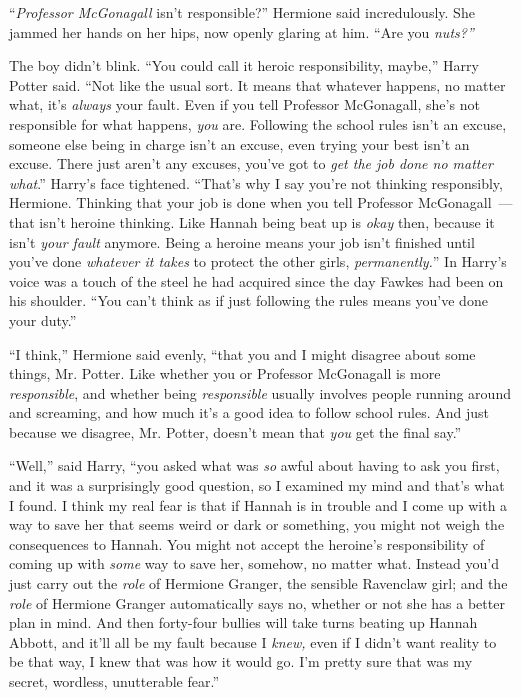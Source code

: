``\emph{Professor McGonagall} isn't responsible?'' Hermione said incredulously. She jammed her hands on her hips, now openly glaring at him. ``Are you \emph{nuts?''}

The boy didn't blink. ``You could call it heroic responsibility, maybe,'' Harry Potter said. ``Not like the usual sort. It means that whatever happens, no matter what, it's \emph{always} your fault. Even if you tell Professor McGonagall, she's not responsible for what happens, \emph{you} are. Following the school rules isn't an excuse, someone else being in charge isn't an excuse, even trying your best isn't an excuse. There just aren't any excuses, you've got to \emph{get the job done no matter what}.'' Harry's face tightened. ``That's why I say you're not thinking responsibly, Hermione. Thinking that your job is done when you tell Professor McGonagall~--- that isn't heroine thinking. Like Hannah being beat up is \emph{okay} then, because it isn't \emph{your fault} anymore. Being a heroine means your job isn't finished until you've done \emph{whatever it takes} to protect the other girls, \emph{permanently.}'' In Harry's voice was a touch of the steel he had acquired since the day Fawkes had been on his shoulder. ``You can't think as if just following the rules means you've done your duty.''

``I think,'' Hermione said evenly, ``that you and I might disagree about some things, Mr. Potter. Like whether you or Professor McGonagall is more \emph{responsible}, and whether being \emph{responsible} usually involves people running around and screaming, and how much it's a good idea to follow school rules. And just because we disagree, Mr. Potter, doesn't mean that \emph{you} get the final say.''

``Well,'' said Harry, ``you asked what was \emph{so} awful about having to ask you first, and it was a surprisingly good question, so I examined my mind and that's what I found. I think my real fear is that if Hannah is in trouble and I come up with a way to save her that seems weird or dark or something, you might not weigh the consequences to Hannah. You might not accept the heroine's responsibility of coming up with \emph{some} way to save her, somehow, no matter what. Instead you'd just carry out the \emph{role} of Hermione Granger, the sensible Ravenclaw girl; and the \emph{role} of Hermione Granger automatically says no, whether or not she has a better plan in mind. And then forty-four bullies will take turns beating up Hannah Abbott, and it'll all be my fault because I \emph{knew,} even if I didn't want reality to be that way, I knew that was how it would go. I'm pretty sure that was my secret, wordless, unutterable fear.''

